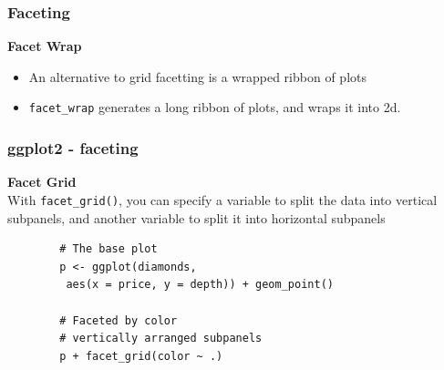 \documentclass{beamer}
\begin{document}
\begin{frame}
	\frametitle{Faceting}
\Large
\vspace{-1cm}
\noindent \textbf{Facet Wrap}
\begin{itemize}
\item An alternative to grid facetting is a wrapped ribbon of plots
\item \texttt{facet\_wrap} generates a long ribbon of plots, and wraps it into 2d.
\end{itemize}

\end{frame}




\begin{frame}[fragile]
\frametitle{ggplot2 - faceting}
	\large
\noindent \textbf{Facet Grid}\\
With \texttt{facet\_grid()}, you can specify a variable to split the data into vertical subpanels, and another variable to split it into horizontal subpanels
\begin{framed}
		\begin{verbatim}
		# The base plot
		p <- ggplot(diamonds, 
		 aes(x = price, y = depth)) + geom_point()
		
		# Faceted by color
		# vertically arranged subpanels
		p + facet_grid(color ~ .)
		\end{verbatim}
	\end{framed}
\end{frame}
\end{document}
